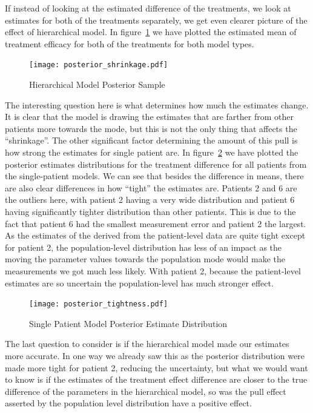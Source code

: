 \documentclass[12pt,a4paper,leqno]{report}
\theoremstyle{plain}
\theoremstyle{definition}
\theoremstyle{remark}
\begin{document}
If instead of looking at the estimated difference of the treatments, we look at estimates
for both of the treatments separately, we get even clearer picture of the effect of
hierarchical model. In figure\ \ref{posteriorshrinkage} we have plotted the estimated mean of
treatment efficacy for both of the treatments for both model types.


\bigskip
\begin{figure}[H]
    \caption{Hierarchical Model Posterior Sample}\label{posteriorshrinkage}
    \bigskip
    \centering
    \texttt{[image: posterior\_shrinkage.pdf]}
\end{figure}
\bigskip

The interesting question here is what determines how much the
estimates change. It is clear that the model is drawing the estimates that are
farther from other patients more towards the mode, but this is not the only thing that
affects the ``shrinkage''. The other significant
factor determining the amount of this pull is how strong the estimates for single
patient are. In figure\ \ref{modeltightness} we have plotted the posterior estimates
distributions for the treatment difference for all patients from the single-patient
models. We can see that besides the
difference in means, there are also clear differences in how ``tight'' the estimates
are. Patients 2 and 6 are the outliers here, with patient 2 having a very wide
distribution and patient 6 having significantly tighter
distribution than other patients. This
is due to the fact that patient 6 had the smallest measurement error and patient 2 the
largest. As the estimates of the derived from the patient-level data are quite tight
except for patient 2, the population-level distribution has less of an impact as the
moving the parameter values towards the population mode would make the measurements we
got much less likely. With patient 2, because the patient-level estimates are so
uncertain the population-level has much stronger effect.

\bigskip
\begin{figure}[H]
    \caption{Single Patient Model Posterior Estimate Distribution}\label{modeltightness}
    \bigskip
    \centering
    \texttt{[image: posterior\_tightness.pdf]}
\end{figure}
\bigskip

The last question to consider is if the hierarchical model made our estimates more
accurate. In one way we already saw this as the posterior distribution were made more
tight for patient 2, reducing the uncertainty, but what we would want to know is if the
estimates of the treatment effect difference are closer to the true difference of the
parameters in the hierarchical model, so was the pull effect asserted by the population
level distribution have a positive effect.
\end{document}
